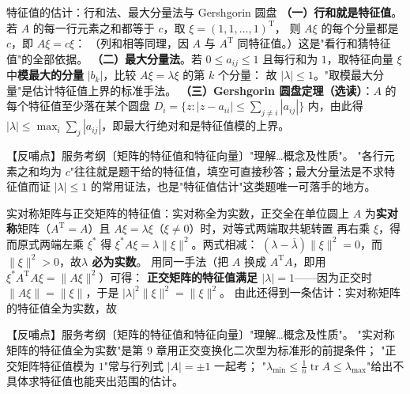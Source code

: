 \begin{fdeep}{特征值的估计：行和法、最大分量法与 Gershgorin 圆盘}
\textbf{（一）行和就是特征值}。若 $A$ 的每一行元素之和都等于 $c$，取 $\xi=(1,1,\dots,1)^{\mathrm T}$，
则 $A\xi$ 的每个分量都是 $c$，即 $A\xi=c\xi$：
（列和相等同理，因 $A$ 与 $A^{\mathrm T}$ 同特征值。）这是"看行和猜特征值"的全部依据。
\textbf{（二）最大分量法}。若 $0\le a_{ij}\le1$ 且每行和为 $1$，取特征向量 $\xi$ 中\textbf{模最大的分量}
$|b_k|$，比较 $A\xi=\lambda\xi$ 的第 $k$ 个分量：
故 $|\lambda|\le1$。"取模最大分量"是估计特征值上界的标准手法。
\textbf{（三）Gershgorin 圆盘定理（选读）}：$A$ 的每个特征值至少落在某个圆盘
$D_i=\{z:|z-a_{ii}|\le\sum_{j\ne i}|a_{ij}|\}$ 内，由此得
$\lvert\lambda\rvert\le\max_i\sum_j|a_{ij}|$，即最大行绝对和是特征值模的上界。

【反哺点】服务考纲〔矩阵的特征值和特征向量〕"理解…概念及性质"。
"各行元素之和均为 $c$"往往就是题干给的特征值，填空可直接秒答；最大分量法是不求特征值而证
$|\lambda|\le1$ 的常用证法，也是"特征值估计"这类题唯一可落手的地方。
\end{fdeep}

\begin{fdeep}{实对称矩阵与正交矩阵的特征值：实对称全为实数，正交全在单位圆上}
$A$ 为\textbf{实对称}矩阵（$A^{\mathrm T}=A$）且 $A\xi=\lambda\xi$（$\xi\ne0$）时，对等式两端取共轭转置
再右乘 $\xi$，得
而原式两端左乘 $\xi^{*}$ 得 $\xi^{*}A\xi=\lambda\lVert\xi\rVert^{2}$。两式相减：
$(\lambda-\overline{\lambda})\lVert\xi\rVert^{2}=0$，而 $\lVert\xi\rVert^{2}>0$，故\textbf{$\lambda$ 必为实数}。
用同一手法（把 $A$ 换成 $A^{\mathrm T}A$，即用 $\xi^{*}A^{\mathrm T}A\xi=\lVert A\xi\rVert^{2}$）可得：
\textbf{正交矩阵的特征值满足 $|\lambda|=1$}——因为正交时 $\lVert A\xi\rVert=\lVert\xi\rVert$，于是
$|\lambda|^{2}\lVert\xi\rVert^{2}=\lVert\xi\rVert^{2}$。
由此还得到一条估计：实对称矩阵的特征值全为实数，故

【反哺点】服务考纲〔矩阵的特征值和特征向量〕"理解…概念及性质"。
"实对称矩阵的特征值全为实数"是第 9 章用正交变换化二次型为标准形的前提条件；
"正交矩阵特征值模为 $1$"常与行列式 $\lvert A\rvert=\pm1$ 一起考；
"$\lambda_{\min}\le\frac{1}{n}\operatorname{tr}A\le\lambda_{\max}$"给出不具体求特征值也能夹出范围的估计。
\end{fdeep}

